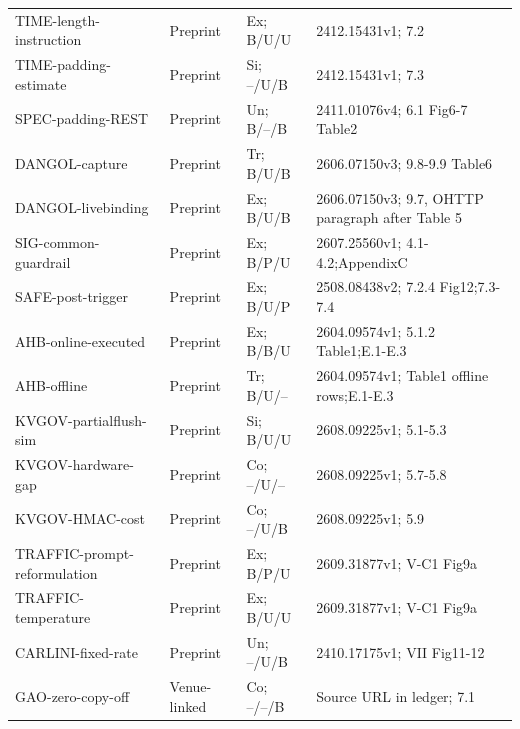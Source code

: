 \begin{longtable}{@{}p{}p{}p{}p{}@{}}
TIME-\allowbreak{}length-\allowbreak{}instruction~\cite{timewilltell2024} & Preprint & Ex; B/U/U & 2412.15431v1; 7.2\\
TIME-\allowbreak{}padding-\allowbreak{}estimate~\cite{timewilltell2024} & Preprint & Si; --/U/B & 2412.15431v1; 7.3\\
SPEC-\allowbreak{}padding-\allowbreak{}REST~\cite{wei2024speculation} & Preprint & Un; B/--/B & 2411.01076v4; 6.1 Fig6-7 Table2\\
DANGOL-\allowbreak{}capture~\cite{dangol2026workflow} & Preprint & Tr; B/U/B & 2606.07150v3; 9.8-9.9 Table6\\
DANGOL-\allowbreak{}livebinding~\cite{dangol2026workflow} & Preprint & Ex; B/U/B & 2606.07150v3; 9.7, OHTTP paragraph after Table 5\\
SIG-\allowbreak{}common-\allowbreak{}guardrail~\cite{geng2026sigleak} & Preprint & Ex; B/P/U & 2607.25560v1; 4.1-4.2;AppendixC\\
SAFE-\allowbreak{}post-\allowbreak{}trigger~\cite{chu2025safekv} & Preprint & Ex; B/U/P & 2508.08438v2; 7.2.4 Fig12;7.3-7.4\\
AHB-\allowbreak{}online-\allowbreak{}executed~\cite{zhu2026turing} & Preprint & Ex; B/B/U & 2604.09574v1; 5.1.2 Table1;E.1-E.3\\
AHB-\allowbreak{}offline~\cite{zhu2026turing} & Preprint & Tr; B/U/-- & 2604.09574v1; Table1 offline rows;E.1-E.3\\
KVGOV-\allowbreak{}partialflush-\allowbreak{}sim~\cite{addagada2026kvgov} & Preprint & Si; B/U/U & 2608.09225v1; 5.1-5.3\\
KVGOV-\allowbreak{}hardware-\allowbreak{}gap~\cite{addagada2026kvgov} & Preprint & Co; --/U/-- & 2608.09225v1; 5.7-5.8\\
KVGOV-\allowbreak{}HMAC-\allowbreak{}cost~\cite{addagada2026kvgov} & Preprint & Co; --/U/B & 2608.09225v1; 5.9\\
TRAFFIC-\allowbreak{}prompt-\allowbreak{}reformulation~\cite{pouryousef2026traffic} & Preprint & Ex; B/P/U & 2609.31877v1; V-C1 Fig9a\\
TRAFFIC-\allowbreak{}temperature~\cite{pouryousef2026traffic} & Preprint & Ex; B/U/U & 2609.31877v1; V-C1 Fig9a\\
CARLINI-\allowbreak{}fixed-\allowbreak{}rate~\cite{carlini2024remote} & Preprint & Un; --/U/B & 2410.17175v1; VII Fig11-12\\
GAO-\allowbreak{}zero-\allowbreak{}copy-\allowbreak{}off~\cite{gao2025iknow} & Venue-linked & Co; --/--/B & Source URL in ledger; 7.1\\

\end{longtable}
